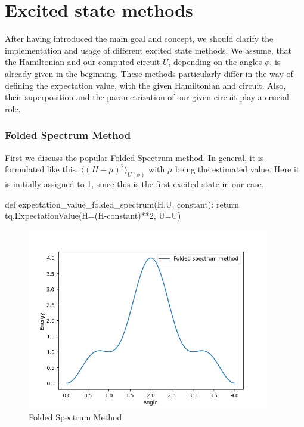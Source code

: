 \documentclass[
  letterpaper,
  DIV=11,
  numbers=noendperiod]{scrartcl}
\newenvironment{Shaded}{\begin{snugshade}}{\end{snugshade}}
\newcommand{\ControlFlowTok}[1]{\textcolor[rgb]{0.00,0.23,0.31}{#1}}
\newcommand{\DecValTok}[1]{\textcolor[rgb]{0.68,0.00,0.00}{#1}}
\newcommand{\KeywordTok}[1]{\textcolor[rgb]{0.00,0.23,0.31}{#1}}
\newcommand{\NormalTok}[1]{\textcolor[rgb]{0.00,0.23,0.31}{#1}}
\newcommand{\OperatorTok}[1]{\textcolor[rgb]{0.37,0.37,0.37}{#1}}
\begin{document}
\section{Excited state methods}\label{excited-state-methods}

After having introduced the main goal and concept, we should clarify the
implementation and usage of different excited state methods. We assume,
that the Hamiltonian and our computed circuit \(U\), depending on the
angles \(\phi\), is already given in the beginning. These methods
particularly differ in the way of defining the expectation value, with
the given Hamiltonian and circuit. Also, their superposition and the
parametrization of our given circuit play a crucial role.

\subsubsection{Folded Spectrum Method}\label{folded-spectrum-method}

First we discuss the popular Folded Spectrum method. In general, it is
formulated like this: \(\langle (H-\mu)^2\rangle_{U(\phi)}\) with
\(\mu\) being the estimated value. Here it is initially assigned to 1,
since this is the first excited state in our case.\\

\begin{Shaded}
\begin{Highlighting}[]
\KeywordTok{def}\NormalTok{ expectation\_value\_folded\_spectrum(H,U, constant):}
    \ControlFlowTok{return}\NormalTok{ tq.ExpectationValue(H}\OperatorTok{=}\NormalTok{(H}\OperatorTok{{-}}\NormalTok{constant)}\OperatorTok{**}\DecValTok{2}\NormalTok{, U}\OperatorTok{=}\NormalTok{U)}
\end{Highlighting}
\end{Shaded}

\begin{figure}[H]

{\centering \includegraphics[width=4.16667in,height=\textheight]{Folded_spectrum.png}

}

\caption{Folded Spectrum Method}

\end{figure}%
\end{document}
